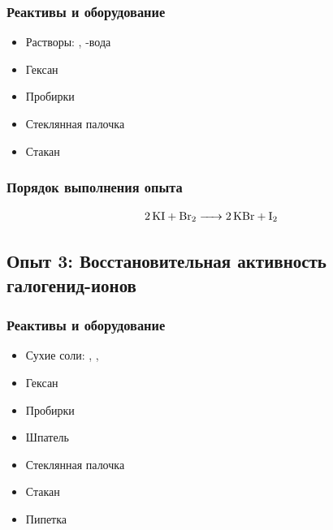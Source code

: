 \documentclass[a4paper, 12pt]{article}
\begin{document}
\subsubsection{Реактивы и оборудование}

\begin{itemize}
	\item Растворы: , -вода
	
	\item Гексан
	
	\item Пробирки
	
	\item Стеклянная палочка
	
	\item Стакан
\end{itemize}

\subsubsection{Порядок выполнения опыта}

\begin{align}
	\ce{2KI + Br2 -> 2KBr + I2}
\end{align}


\subsection{Опыт 3: Восстановительная активность галогенид-ионов}

\subsubsection{Реактивы и оборудование}

\begin{itemize}
	\item Сухие соли: , , 
	
	\item Гексан
	
	\item Пробирки
	
	\item Шпатель
	
	\item Стеклянная палочка
	
	\item Стакан
	
	\item Пипетка
\end{itemize}
\end{document}
